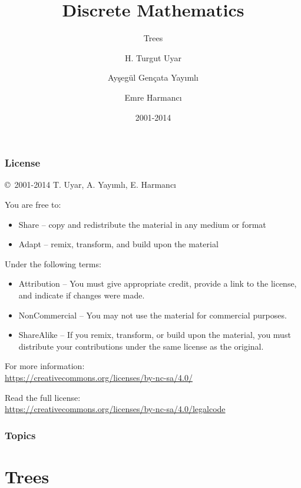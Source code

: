 \documentclass[dvipsnames]{beamer}
\title{Discrete Mathematics}
\subtitle{Trees}
\author{H. Turgut Uyar \and Ayşegül Gençata Yayımlı \and Emre Harmancı}
\date{2001-2014}
\begin{document}
\begin{frame}
  \titlepage
\end{frame}

\begin{frame}
  \frametitle{License}

  \hfill
  \copyright~2001-2014 T. Uyar, A. Yayımlı, E. Harmancı

  \vfill
  \begin{footnotesize}
    You are free to:
    \begin{itemize}
      \itemsep0em
      \item Share -- copy and redistribute the material in any medium or format
      \item Adapt -- remix, transform, and build upon the material
    \end{itemize}

    Under the following terms:
    \begin{itemize}
      \itemsep0em
      \item Attribution -- You must give appropriate credit, provide a link to
        the license, and indicate if changes were made.

      \item NonCommercial -- You may not use the material for commercial
        purposes.

      \item ShareAlike -- If you remix, transform, or build upon the material,
        you must distribute your contributions under the same license as the
        original.
    \end{itemize}
  \end{footnotesize}

  \begin{small}
    For more information:\\
    \url{https://creativecommons.org/licenses/by-nc-sa/4.0/}

    \smallskip
    Read the full license:\\
    \url{https://creativecommons.org/licenses/by-nc-sa/4.0/legalcode}
  \end{small}
\end{frame}

\begin{frame}
  \frametitle{Topics}
  \tableofcontents
\end{frame}

\section{Trees}
\end{document}

